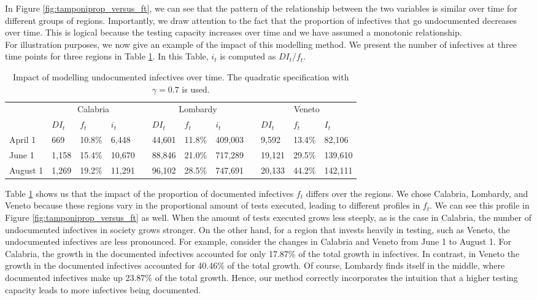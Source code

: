\documentclass[12pt]{article}
\begin{document}
	In Figure \ref{fig:tamponiprop_versus_ft}, we can see that the pattern of the relationship between the two variables is similar over time for different groups of regions. Importantly, we draw attention to the fact that the proportion of infectives that go undocumented decreases over time. This is logical because the testing capacity increases over time and we have assumed a monotonic relationship. \\
	
	For illustration purposes, we now give an example of the impact of this modelling method. We present the number of infectives at three time points for three regions in Table \ref{tab:f_t_over_time}. In this Table, $i_t$ is computed as $DI_t / f_t$.
	
	\begin{table}[H]
		\centering
		\caption{Impact of modelling undocumented infectives over time. The quadratic specification with $\gamma = 0.7$ is used.}
		\label{tab:f_t_over_time}
		\begin{tabular}{llllllllllll}
		    \toprule 
                     & \multicolumn{3}{c}{Calabria} && \multicolumn{3}{c}{Lombardy} && \multicolumn{3}{c}{Veneto} \\
                     \cmidrule{2-4}\cmidrule{6-8}\cmidrule{10-12}
                     & $DI_t$  & $f_t$   & $i_t$   && $DI_t$  & $f_t$   & $i_t$    && $DI_t$  & $f_t$  & $I_t$   \\ \midrule
            April 1  & 669     & 10.8\%  & 6,448   && 44,601  & 11.8\%  & 409,003  && 9,592   & 13.4\% & 82,106  \\
            June 1   & 1,158   & 15.4\%  & 10,670  && 88,846  & 21.0\%  & 717,289  && 19,121  & 29.5\% & 139,610 \\
            August 1 & 1,269   & 19.2\%  & 11,291  && 96,102  & 28.5\%  & 747,691  && 20,133  & 44.2\% & 142,111 \\ \bottomrule
        \end{tabular}
	\end{table}
	
	Table \ref{tab:f_t_over_time} shows us that the impact of the proportion of documented infectives $f_t$ differs over the regions. We chose Calabria, Lombardy, and Veneto because these regions vary in the proportional amount of tests executed, leading to different profiles in $f_t$. We can see this profile in Figure \ref{fig:tamponiprop_versus_ft} as well. When the amount of tests executed grows less steeply, as is the case in Calabria, the number of undocumented infectives in society grows stronger. On the other hand, for a region that invests heavily in testing, such as Veneto, the undocumented infectives are less pronounced. For example, consider the changes in Calabria and Veneto from June 1 to August 1. For Calabria, the growth in the documented infectives accounted for only 17.87\% of the total growth in infectives. In contrast, in Veneto the growth in the documented infectives accounted for 40.46\% of the total growth. Of course, Lombardy finds itself in the middle, where documented infectives make up 23.87\% of the total growth. Hence, our method correctly incorporates the intuition that a higher testing capacity leads to more infectives being documented. \\
	
\end{document}
